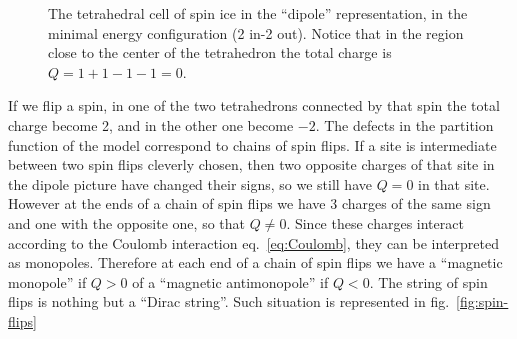 \documentclass[../main/main.tex]{subfiles}
\begin{document}
\begin{figure}[h]

\caption{The tetrahedral cell of spin ice in the ``dipole'' representation, in the minimal energy configuration (2 in-2 out). Notice that in the region close to the center of the tetrahedron the total charge is $Q=1+1-1-1=0$.}
\label{fig:spin-ice-dipole}
\end{figure}

If we flip a spin, in one of the two tetrahedrons connected by that spin the total charge become 2, and in the other one become $-2$. The defects in the partition function of the model correspond to chains of spin flips. If a site is intermediate between two spin flips cleverly chosen, then two opposite charges of that site in the dipole picture have changed their signs, so we still have $Q=0$ in that site. However at the ends of a chain of spin flips we have 3 charges of the same sign and one with the opposite one, so that $Q\neq0$. Since these charges interact according to the Coulomb interaction eq.~\eqref{eq:Coulomb}, they can be interpreted as monopoles. Therefore at each end of a chain of spin flips we have a ``magnetic monopole'' if $Q>0$ of a ``magnetic antimonopole'' if $Q<0$. The string of spin flips is nothing but a ``Dirac string''. Such situation is represented in fig.~\ref{fig:spin-flips}
\end{document}
